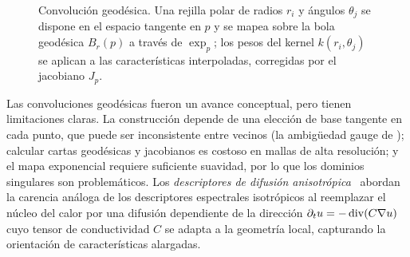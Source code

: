 \begin{figure}[h]
\centering
{}
\caption[Convoluci\'on geod\'esica]{Convoluci\'on geod\'esica. Una rejilla polar
de radios $r_i$ y \'angulos $\theta_j$ se dispone en el espacio tangente en $p$
y se mapea sobre la bola geod\'esica $B_r(p)$ a trav\'es de $\exp_p$; los pesos
del kernel $k(r_i,\theta_j)$ se aplican a las caracter\'isticas interpoladas,
corregidas por el jacobiano $J_p$.}
\label{fig:geo:convolution}
\end{figure}

Las convoluciones geod\'esicas fueron un avance conceptual, pero tienen
limitaciones claras. La construcci\'on depende de una elecci\'on de base
tangente en cada punto, que puede ser inconsistente entre vecinos (la
ambig\"uedad gauge de ); calcular cartas geod\'esicas y
jacobianos es costoso en mallas de alta resoluci\'on; y el mapa exponencial
requiere suficiente suavidad, por lo que los dominios singulares son
problem\'aticos. Los \emph{descriptores de difusi\'on
anisotr\'opica}~\citep{Boscaini2016AnisotropicDD} abordan la carencia an\'aloga
de los descriptores espectrales isotr\'opicos al reemplazar el n\'ucleo del calor
por una difusi\'on dependiente de la direcci\'on
$\partial_t u = -\operatorname{div}(C \nabla u)$ cuyo tensor de conductividad $C$ se
adapta a la geometr\'ia local, capturando la orientaci\'on de caracter\'isticas
alargadas.

